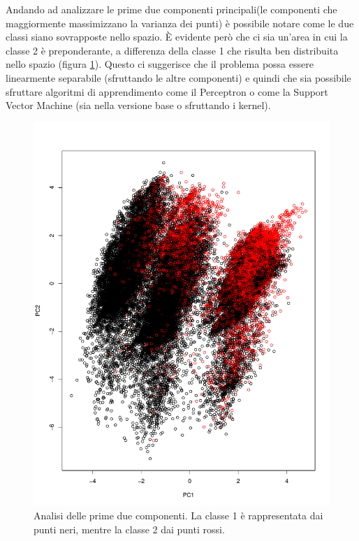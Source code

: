 \documentclass[fleqn,10pt]{SelfArx} %
\begin{document}
Andando ad analizzare le prime due componenti principali(le componenti che maggiormente massimizzano la varianza dei punti) è possibile notare come le due classi siano sovrapposte nello spazio. È evidente però che ci sia un'area in cui la classe 2 è preponderante, a differenza della classe 1 che risulta ben distribuita nello spazio (figura \ref{pca1}). Questo ci suggerisce che il problema possa essere linearmente separabile (sfruttando le altre componenti) e quindi che sia possibile sfruttare algoritmi di apprendimento come il Perceptron o come la Support Vector Machine (sia nella versione base o sfruttando i kernel).
\begin{figure}
\includegraphics[scale=0.30]{comp1_2.pdf}
\caption{\footnotesize{Analisi delle prime due componenti. La classe 1 è rappresentata dai punti neri, mentre la classe 2 dai punti rossi.}}
\label{pca1}
\end{figure}
\end{document}
